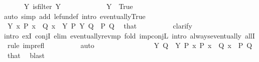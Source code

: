 \begin{isabellebody}
\ \ \ \ \isamarkupfalse%
\ Y{\isacharcolon}{\kern0pt}\ {\isachardoublequoteopen}is{\isacharunderscore}{\kern0pt}filter\ {\isacharquery}{\kern0pt}Y{\isachardoublequoteclose}\isanewline
\ \ \ \ \isamarkupfalse%
\isanewline
\ \ \ \ \ \ \isamarkupfalse%
\ {\isachardoublequoteopen}{\isacharquery}{\kern0pt}Y\ {\isacharparenleft}{\kern0pt}{\isasymlambda}{\isacharunderscore}{\kern0pt}{\isachardot}{\kern0pt}\ True{\isacharparenright}{\kern0pt}{\isachardoublequoteclose}\ \isamarkupfalse%
{\isacharparenleft}{\kern0pt}auto\ simp\ add{\isacharcolon}{\kern0pt}\ le{\isacharunderscore}{\kern0pt}fun{\isacharunderscore}{\kern0pt}def\ intro{\isacharcolon}{\kern0pt}\ eventually{\isacharunderscore}{\kern0pt}True{\isacharparenright}{\kern0pt}\isanewline
\ \ \ \ \ \ \isamarkupfalse%
\ {\isachardoublequoteopen}{\isacharquery}{\kern0pt}Y\ {\isacharparenleft}{\kern0pt}{\isasymlambda}x{\isachardot}{\kern0pt}\ P\ x\ {\isasymand}\ Q\ x{\isacharparenright}{\kern0pt}{\isachardoublequoteclose}\ \ {\isachardoublequoteopen}{\isacharquery}{\kern0pt}Y\ P{\isachardoublequoteclose}\ {\isachardoublequoteopen}{\isacharquery}{\kern0pt}Y\ Q{\isachardoublequoteclose}\ \ P\ Q\ \isamarkupfalse%
\ that\isanewline
\ \ \ \ \ \ \ \ \isamarkupfalse%
\ clarify\isanewline
\ \ \ \ \ \ \ \ \isamarkupfalse%
{\isacharparenleft}{\kern0pt}intro\ exI\ conjI{\isacharsemicolon}{\kern0pt}\ {\isacharparenleft}{\kern0pt}elim\ eventually{\isacharunderscore}{\kern0pt}rev{\isacharunderscore}{\kern0pt}mp{\isacharsemicolon}{\kern0pt}\ fold\ imp{\isacharunderscore}{\kern0pt}conjL{\isacharsemicolon}{\kern0pt}\ intro\ always{\isacharunderscore}{\kern0pt}eventually\ allI{\isacharsemicolon}{\kern0pt}\ rule\ imp{\isacharunderscore}{\kern0pt}refl{\isacharparenright}{\kern0pt}{\isacharquery}{\kern0pt}{\isacharparenright}{\kern0pt}\isanewline
\ \ \ \ \ \ \ \ \isamarkupfalse%
\ auto\isanewline
\ \ \ \ \ \ \ \ \isamarkupfalse%
\isanewline
\ \ \ \ \ \ \isamarkupfalse%
\ {\isachardoublequoteopen}{\isacharquery}{\kern0pt}Y\ Q{\isachardoublequoteclose}\ \ {\isachardoublequoteopen}{\isacharquery}{\kern0pt}Y\ P{\isachardoublequoteclose}\ {\isachardoublequoteopen}{\isasymforall}x{\isachardot}{\kern0pt}\ P\ x\ {\isasymlongrightarrow}\ Q\ x{\isachardoublequoteclose}\ \ P\ Q\ \isamarkupfalse%
\ that\ \isamarkupfalse%
\ blast\isanewline
\ \ \ \ \isamarkupfalse%

\end{isabellebody}
